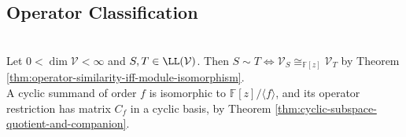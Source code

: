 \subsection{Operator Classification}

\begin{perspective} \label{per:operator-module-similarity-dictionary} \\
Let $0<\dim\mathcal{V}<\infty$ and $S,T\in\LL(\mathcal{V})$. Then $S\sim T\Longleftrightarrow\mathcal{V}_S\cong_{\mathbb{F}[z]}\mathcal{V}_T$ by Theorem \ref{thm:operator-similarity-iff-module-isomorphism}.\\
A cyclic summand of order $f$ is isomorphic to $\mathbb{F}[z]/\langle f\rangle$, and its operator restriction has matrix $C_f$ in a cyclic basis, by Theorem \ref{thm:cyclic-subspace-quotient-and-companion}.
\end{perspective}

